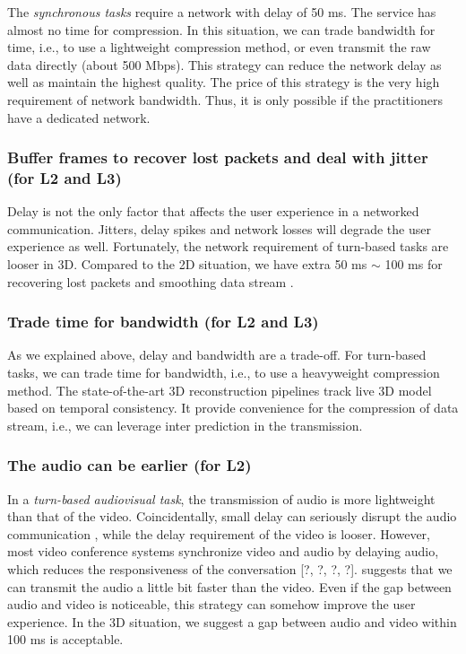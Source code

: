 The \emph{synchronous tasks} require a network with delay of 50 ms. The service has almost no time for compression. In this situation, we can trade bandwidth for time, i.e., to use a lightweight compression method, or even transmit the raw data directly (about 500 Mbps). This strategy can reduce the network delay as well as maintain the highest quality. The price of this strategy is the very high requirement of network bandwidth. Thus, it is only possible if the practitioners have a dedicated network.
    
\subsubsection{Buffer frames to recover lost packets and deal with jitter (for L2 and L3)}
    
Delay is not the only factor that affects the user experience in a networked communication. Jitters, delay spikes and network losses will degrade the user experience as well. Fortunately, the network requirement of turn-based tasks are looser in 3D. Compared to the 2D situation, we have extra 50 ms $\sim$ 100 ms for recovering lost packets and smoothing data stream .

\subsubsection{Trade time for bandwidth (for L2 and L3)}
    
As we explained above, delay and bandwidth are a trade-off. For turn-based tasks, we can trade time for bandwidth, i.e., to use a heavyweight compression method. The state-of-the-art 3D reconstruction pipelines \cite{orts2016holoportation, dou2016fusion4d} track live 3D model based on temporal consistency. It provide convenience for the compression of data stream, i.e., we can leverage inter prediction in the transmission.
    
\subsubsection{The audio can be earlier (for L2)}
    
In a \emph{turn-based audiovisual task}, the transmission of audio is more lightweight than that of the video. Coincidentally, small delay can seriously disrupt the audio communication \cite{krauss1967effects}, while the delay requirement of the video is looser. However, most video conference systems synchronize video and audio by delaying audio, which reduces the responsiveness of the conversation [?, ?, ?, ?]. \cite{isaacs1994video} suggests that we can transmit the audio a little bit faster than the video. Even if the gap between audio and video is noticeable, this strategy can somehow improve the user experience. In the 3D situation, we suggest a gap between audio and video within 100 ms is acceptable.

\fi
